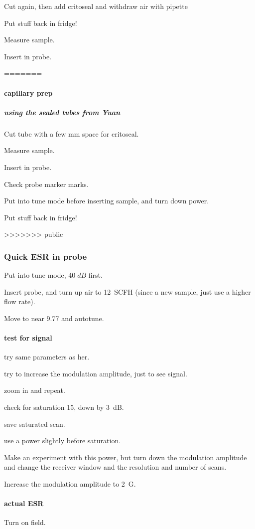 Cut again, then add critoseal and withdraw air with pipette

Put stuff back in fridge!

Measure sample.

Insert in probe.

=======
\paragraph{capillary prep}
\subparagraph{using the sealed tubes from Yuan}
Cut tube with a few mm space for critoseal.

Measure sample.

Insert in probe.

Check probe marker marks.

Put into tune mode before inserting sample, and turn down power.

Put stuff back in fridge!

>>>>>>> public
\subsubsection{Quick ESR in probe}
Put into tune mode, $40\;dB$ first.

Insert probe, and turn up air to 12~SCFH (since a new sample, just use a higher flow rate).

Move to near 9.77 and autotune.

\paragraph{test for signal}
try same parameters as her.

try to increase the modulation amplitude, just to see signal.

zoom in and repeat.

check for saturation 15, down by 3~dB.

save saturated scan.

use a power slightly before saturation.

Make an experiment with this power, but turn down the modulation amplitude and change the receiver window and the resolution and number of scans.

Increase the modulation amplitude to 2~G.

\paragraph{actual ESR}
Turn on field.

